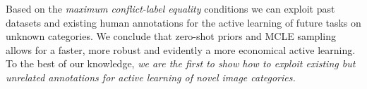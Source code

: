 \documentclass[10pt,twocolumn,letterpaper]{article}
\newcommand{\red}[1]{\textcolor{red}{#1}}
\begin{document}
Based on the \emph{maximum conflict-label equality} conditions we can exploit past datasets and existing human annotations for the active learning of future tasks on unknown categories. We conclude that zero-shot priors and MCLE sampling allows for a faster, more robust and evidently a more economical active learning. To the best of our knowledge, \emph{we are the first to show how to exploit existing but unrelated annotations for active learning of novel image categories.}%
\end{document}

